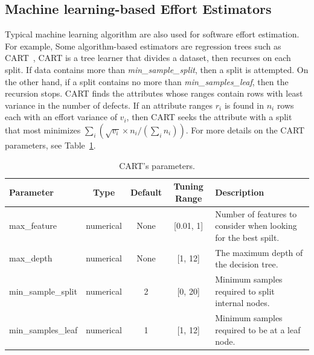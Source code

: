 \subsection{Machine learning-based Effort Estimators}
\label{sec:algo}


\newcommand{\centered}[1]{\begin{tabular}{l} #1 \end{tabular}}



Typical machine learning algorithm are also used for software effort estimation. For example, Some algorithm-based estimators are regression trees such as CART~\cite{brieman84}, 
CART is a  tree learner that divides a dataset, then recurses
on each split.
If data contains more than {\em min\_sample\_split}, then a split is attempted.
On the other hand, if a split contains no more than {\em min\_samples\_leaf}, then the recursion stops. 
CART finds the attributes whose ranges contain rows with least variance in the number
of defects. If an  attribute ranges $r_i$ is found in 
$n_i$ rows each with an effort  variance of $v_i$, then CART seeks the  attribute with a split that most
minimizes $\sum_i \left(\sqrt{v_i}\times n_i/(\sum_i n_i)\right)$.
For more details on the CART parameters, see Table~\ref{tbl:cart}.

\begin{table}[!t]
\centering
\caption{CART's parameters.}\label{tbl:cart}
\begin{tabular}{l|c|c|c|p{1.6in}}
\hline \rowcolor{Black!30}
Parameter  &Type        & Default & Tuning Range  & Description     \\\hline
max\_feature & numerical      & None    & {[}0.01, 1{]} &Number of features to consider when looking for the best spilt. \\
\rowcolor{Black!15} max\_depth  &numerical       & None    & {[}1, 12{]}   & The maximum depth of the decision tree.                                     \\
min\_sample\_split & numerical & 2       & {[}0, 20{]}   & Minimum   samples required to split  internal nodes.  \\
\rowcolor{Black!15} min\_samples\_leaf & numerical& 1       & {[}1, 12{]}   &   Minimum   samples required to be at a leaf node.    \\\hline

\end{tabular}
\end{table}


